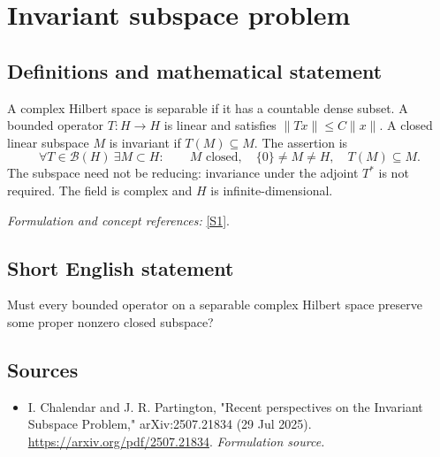 \documentclass[11pt]{article}
\begin{document}
\section*{\texorpdfstring{Invariant subspace problem}{Invariant subspace problem}}\label{3034}
\subsection{Definitions and mathematical statement}
A complex Hilbert space is separable if it has a countable dense subset. A bounded operator $T:H\to H$ is linear and satisfies $\|Tx\|\le C\|x\|$. A closed linear subspace $M$ is invariant if $T(M)\subseteq M$. The assertion is
\[
 \forall T\in\mathcal B(H)\ \exists M\subset H:\qquad
 M\text{ closed},\quad\{0\}\ne M\ne H,\quad T(M)\subseteq M.
\]
The subspace need not be reducing: invariance under the adjoint $T^*$ is not required. The field is complex and $H$ is infinite-dimensional.
\par\smallskip\textit{Formulation and concept references:} \href{https://arxiv.org/pdf/2507.21834}{[S1]}.

\subsection{Short English statement}
Must every bounded operator on a separable complex Hilbert space preserve some proper nonzero closed subspace?
\subsection{Sources}
\begin{itemize}
\item[S1]I. Chalendar and J. R. Partington, "Recent perspectives on the Invariant Subspace Problem," arXiv:2507.21834 (29 Jul 2025).
\url{https://arxiv.org/pdf/2507.21834}.
\textit{Formulation source.}
\end{itemize}
\end{document}
